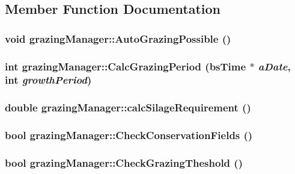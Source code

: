 \subsection{Member Function Documentation}
\hypertarget{classgrazing_manager_a782edbd814727753f68ea5d041f79c9d}{
\subsubsection[{AutoGrazingPossible}]{\setlength{\rightskip}{0pt plus 5cm}void grazingManager::AutoGrazingPossible ()}}
\label{classgrazing_manager_a782edbd814727753f68ea5d041f79c9d}
\hypertarget{classgrazing_manager_aaaedb1e74f765f6501d7bc7772ea8600}{
\subsubsection[{CalcGrazingPeriod}]{\setlength{\rightskip}{0pt plus 5cm}int grazingManager::CalcGrazingPeriod ({\bf bsTime} $\ast$ {\em aDate}, \/  int {\em growthPeriod})}}
\label{classgrazing_manager_aaaedb1e74f765f6501d7bc7772ea8600}
\hypertarget{classgrazing_manager_a17ced3f230c570a362648df3d519b3fa}{
\subsubsection[{calcSilageRequirement}]{\setlength{\rightskip}{0pt plus 5cm}double grazingManager::calcSilageRequirement ()}}
\label{classgrazing_manager_a17ced3f230c570a362648df3d519b3fa}
\hypertarget{classgrazing_manager_a7e94949ab9bfb77da28ac2c3dcd79aaa}{
\subsubsection[{CheckConservationFields}]{\setlength{\rightskip}{0pt plus 5cm}bool grazingManager::CheckConservationFields ()}}
\label{classgrazing_manager_a7e94949ab9bfb77da28ac2c3dcd79aaa}
\hypertarget{classgrazing_manager_aa831a26148a1171fce3f1e2971135d34}{
\subsubsection[{CheckGrazingTheshold}]{\setlength{\rightskip}{0pt plus 5cm}bool grazingManager::CheckGrazingTheshold ()}}
